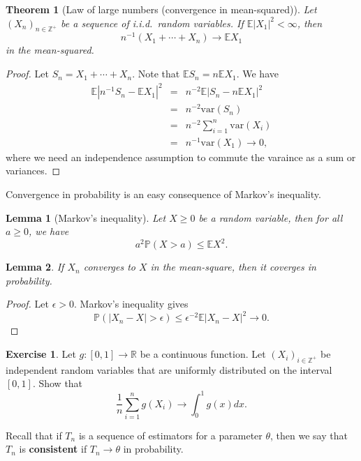 \documentclass[
]{article}
\newtheorem{theorem}{Theorem}[section]
\newtheorem{lemma}{Lemma}[section]
\theoremstyle{definition}
\theoremstyle{definition}
\theoremstyle{definition}
\newtheorem{exercise}{Exercise}[section]
\theoremstyle{remark}
\begin{document}
\begin{theorem}[Law of large numbers (convergence in mean-squared)]
\protect\hypertarget{thm:unnamed-chunk-2}{}{\label{thm:unnamed-chunk-2} \iffalse (Law of large numbers (convergence in mean-squared)) \fi{} }Let \((X_n)_{n \in \mathbb{Z}^{+}}\) be a sequence of i.i.d.~random variables. If \(\mathbb{E} |X_1|^2 < \infty\), then
\[ n^{-1}(X_1 + \cdots + X_n) \to \mathbb{E} X_1\]
in the mean-squared.
\end{theorem}

\begin{proof}
\iffalse{} {Proof. } \fi{}Let \(S_n = X_1 + \cdots + X_n\). Note that \(\mathbb{E} S_n = n \mathbb{E} X_1\). We have\\
\begin{eqnarray*}
\mathbb{E} | n^{-1}S_n - \mathbb{E} X_1 |^2 &=&  n^{-2}\mathbb{E} | S_n - n\mathbb{E} X_1 |^2 \\
&=&  n^{-2}\mathrm{var}(S_n)  \\
&=&  n^{-2} \sum_{i=1} ^n \mathrm{var}(X_i)  \\
&=&  n^{-1}  \mathrm{var}(X_1) \to 0, 
\end{eqnarray*}
where we need an independence assumption to commute the varaince as a sum or variances.
\end{proof}

Convergence in probability is an easy consequence of Markov's inequality.

\begin{lemma}[Markov's inequality]
\protect\hypertarget{lem:unnamed-chunk-4}{}{\label{lem:unnamed-chunk-4} \iffalse (Markov's inequality) \fi{} }Let \(X \geq 0\) be a random variable, then for all \(a \geq 0\), we have
\[ a^2\mathbb{P} ( X > a ) \leq \mathbb{E} X^2.\]
\end{lemma}
\begin{lemma}
\protect\hypertarget{lem:unnamed-chunk-5}{}{\label{lem:unnamed-chunk-5} }If \(X_n\) converges to \(X\) in the mean-square, then it coverges in probability.
\end{lemma}
\begin{proof}
\iffalse{} {Proof. } \fi{}Let \(\epsilon >0\). Markov's inequality gives
\[\mathbb{P} (| X_n - X| > \epsilon) \leq  \epsilon^{-2} \mathbb{E} | X_n -X|^2 \to 0.\]
\end{proof}
\begin{exercise}
\protect\hypertarget{exr:unnamed-chunk-7}{}{\label{exr:unnamed-chunk-7} }Let \(g: [0,1] \to \mathbb{R}\) be a continuous function. Let \((X_i)_{i \in \mathbb{Z}^{+}}\) be independent random variables that are uniformly distributed on the interval \([0,1]\). Show that
\[ \frac{1}{n}\sum_{i=1} ^ n g(X_i) \to \int_0 ^1 g(x) dx.\]
\end{exercise}
Recall that if \(T_n\) is a sequence of estimators for a parameter \(\theta\), then we say that \(T_n\) is \textbf{consistent} if \(T_n \to \theta\) in probability.
\end{document}
